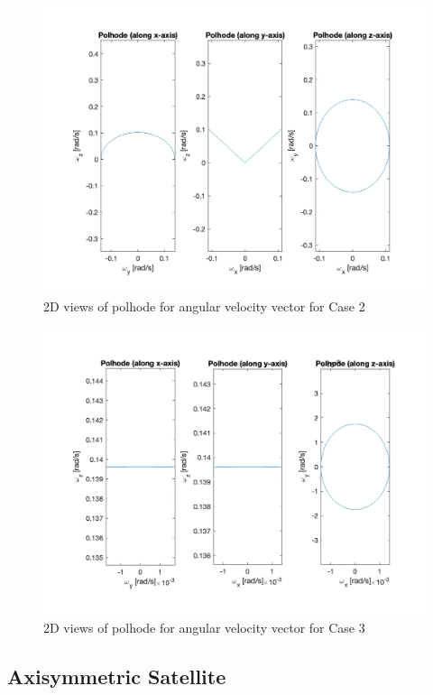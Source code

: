 \begin{figure}[H]
\centering
\includegraphics[scale=0.6]{Images/ps2_problem9_p8_y.png}
\caption{2D views of polhode for angular velocity vector for Case 2}
\label{fig:ps2_problem9_p8_y}
\end{figure}

\begin{figure}[H]
\centering
\includegraphics[scale=0.6]{Images/ps2_problem9_p8_z.png}
\caption{2D views of polhode for angular velocity vector for Case 3}
\label{fig:ps2_problem9_p8_z}
\end{figure}

\subsection{Axisymmetric Satellite}

